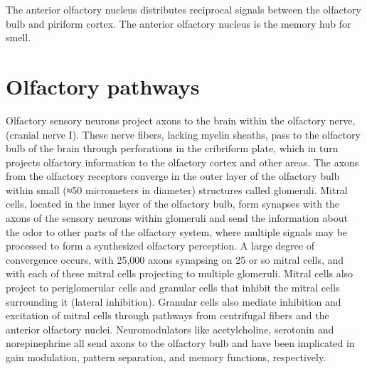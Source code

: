 The anterior olfactory nucleus distributes reciprocal signals between the olfactory bulb and piriform cortex. The anterior olfactory nucleus is the memory hub for smell.

\hypertarget{olfactory-pathways}{%
\section{Olfactory pathways}\label{olfactory-pathways}}

Olfactory sensory neurons project axons to the brain within the olfactory nerve, (cranial nerve I). These nerve fibers, lacking myelin sheaths, pass to the olfactory bulb of the brain through perforations in the cribriform plate, which in turn projects olfactory information to the olfactory cortex and other areas. The axons from the olfactory receptors converge in the outer layer of the olfactory bulb within small (≈50 micrometers in diameter) structures called glomeruli. Mitral cells, located in the inner layer of the olfactory bulb, form synapses with the axons of the sensory neurons within glomeruli and send the information about the odor to other parts of the olfactory system, where multiple signals may be processed to form a synthesized olfactory perception. A large degree of convergence occurs, with 25,000 axons synapsing on 25 or so mitral cells, and with each of these mitral cells projecting to multiple glomeruli. Mitral cells also project to periglomerular cells and granular cells that inhibit the mitral cells surrounding it (lateral inhibition). Granular cells also mediate inhibition and excitation of mitral cells through pathways from centrifugal fibers and the anterior olfactory nuclei. Neuromodulators like acetylcholine, serotonin and norepinephrine all send axons to the olfactory bulb and have been implicated in gain modulation, pattern separation, and memory functions, respectively.

